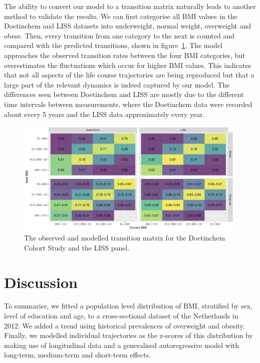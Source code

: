 \documentclass{imammb}
\numberwithin{equation}{section}
\begin{document}
The ability to convert our model to a transition matrix naturally leads to another method to validate the results. We can first categorise all BMI values in the Doetinchem and LISS datasets into underweight, normal weight, overweight and obese. Then, every transition from one category to the next is counted and compared with the predicted transitions, shown in figure~\ref{fig:Transition Matrices}. The model approaches the observed transition rates between the four BMI categories, but overestimates the fluctuations which occur for higher BMI values. This indicates that not all aspects of the life course trajectories are being reproduced but that a large part of the relevant dynamics is indeed captured by our model. The differences seen between Doetinchem and LISS are mostly due to the different time intervals between measurements, where the Doetinchem data were recorded about every 5 years and the LISS data approximately every year.

\vspace{-2mm}

\begin{figure}[!h]
\centering\includegraphics[width=0.99\textwidth] {"Figures/Transition Matrices.pdf"}
\caption{The observed and modelled transition matrix for the Doetinchem Cohort Study and the LISS panel.}
\label{fig:Transition Matrices}
\vspace*{-9pt}
\end{figure}

\section{Discussion}
\label{sec:Discussion}

To summarise, we fitted a population level distribution of BMI, stratified by sex, level of education and age, to a cross-sectional dataset of the Netherlands in 2012. We added a trend using historical prevalences of overweight and obesity. Finally, we modelled individual trajectories as the z-scores of this distribution by making use of longitudinal data and a generalised autoregressive model with long-term, medium-term and short-term effects.
\end{document}
